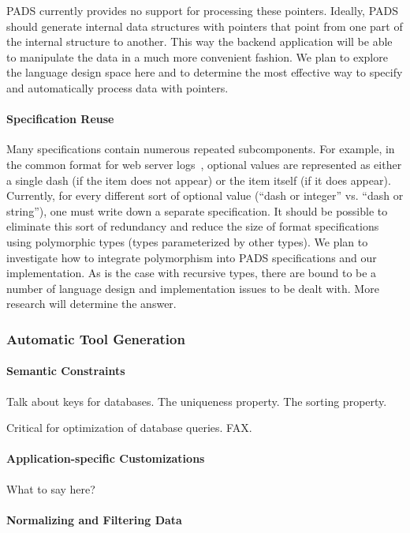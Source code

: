 \documentclass[11pt]{article}
\begin{document}
PADS currently provides no support for processing these pointers.
Ideally, PADS should generate internal
data structures with pointers that point from one part
of the internal structure to another.  This way the backend application
will be able to manipulate the data in a much more convenient fashion.
We plan to explore the language design space here and to determine
the most effective way to specify and automatically process data
with pointers.  

\paragraph*{Specification Reuse}

Many specifications contain numerous repeated subcomponents.  For
example, in the common format for web server logs~\cite{wpp}, optional
values are represented as either a single dash (if the item does not
appear) or the item itself (if it does appear).  Currently, for every
different sort of optional value (\ie ``dash or integer'' vs. ``dash
or string''), one must write down a separate specification.  It should
be possible to eliminate this sort of redundancy and reduce the size
of format specifications using polymorphic types (types parameterized
by other types).  We plan to investigate how to integrate
polymorphism into PADS specifications and our implementation.
As is the case with recursive types, there are bound to be
a number of language design and implementation issues to be dealt with.
More research will determine the answer.

\subsubsection{Automatic Tool Generation}


\paragraph*{Semantic Constraints}
Talk about keys for databases.  The uniqueness property.
The sorting property.

Critical for optimization of database queries.  FAX.

\paragraph*{Application-specific Customizations}
What to say here?


\paragraph*{Normalizing and Filtering Data}
\label{subsec:general}
\end{document}
